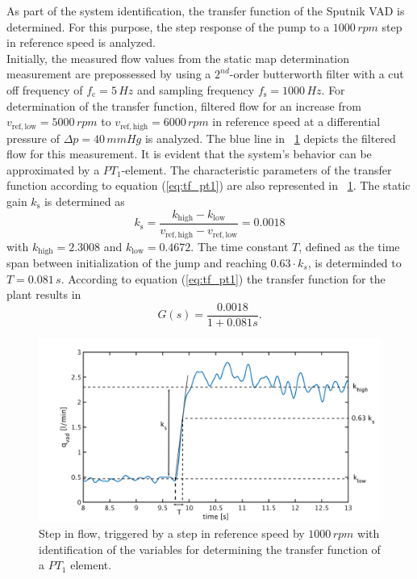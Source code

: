 As part of the system identification, the transfer function of the Sputnik VAD is determined. For this purpose, the step response of the pump to a $1000\,rpm$ step in reference speed is analyzed.
\\Initially, the measured flow values from the static map determination measurement are prepossessed by using a $2^{nd}$-order butterworth filter with a cut off frequency of $f_{\mathrm{c}} = 5\,Hz$ and sampling frequency $f_{\mathrm{s}}=1000 \, Hz$. For determination of the transfer function, filtered flow for an increase from $v_{\mathrm{ref,low}}=5000\,rpm$ to $v_{\mathrm{ref,high}}=6000\,rpm$ in reference speed at a differential pressure of $\Delta{p}=40\,mmHg$ is analyzed. The blue line in \figurename~\ref{fig:plant} depicts the filtered flow for this measurement. It is evident that the system's behavior can be approximated by a $PT_1$-element.
 The characteristic parameters of the transfer function according to equation (\ref{eq:tf_pt1}) are also represented in \figurename~\ref{fig:plant}. The static gain $k_{\mathrm{s}}$ is determined as
\begin{equation}
  k_{\mathrm{s}} = \frac{k_{\mathrm{high}}-k_{\mathrm{low}}}{v_{\mathrm{ref,high}}-v_{\mathrm{ref,low}}}=0.0018
\label{eq:k_s_1}
\end{equation}
with $k_{\mathrm{high}}=2.3008$ and $k_{\mathrm{low}}=0.4672$. The time constant $T$, defined as the time span between initialization of the jump and reaching $0.63 \cdot k_s$, is determinded to $T=0.081\,s$.
According to equation (\ref{eq:tf_pt1}) the transfer function for the plant results in
\begin{equation}
    G(s) = \frac{0.0018}{1+0.081s}.
 \label{eq:plant}
\end{equation}
\begin{figure}[ht!]
  \centering
  \includegraphics[width=\textwidth]{images/chapt_4/plant_generation.pdf}
  \caption[Transfer function of Sputnik VAD]{Step in flow, triggered by a step in reference speed by $1000\,rpm$ with identification of the variables for determining the transfer function of a $PT_{\mathrm{1}}$ element.}
  \label{fig:plant}
\end{figure}
